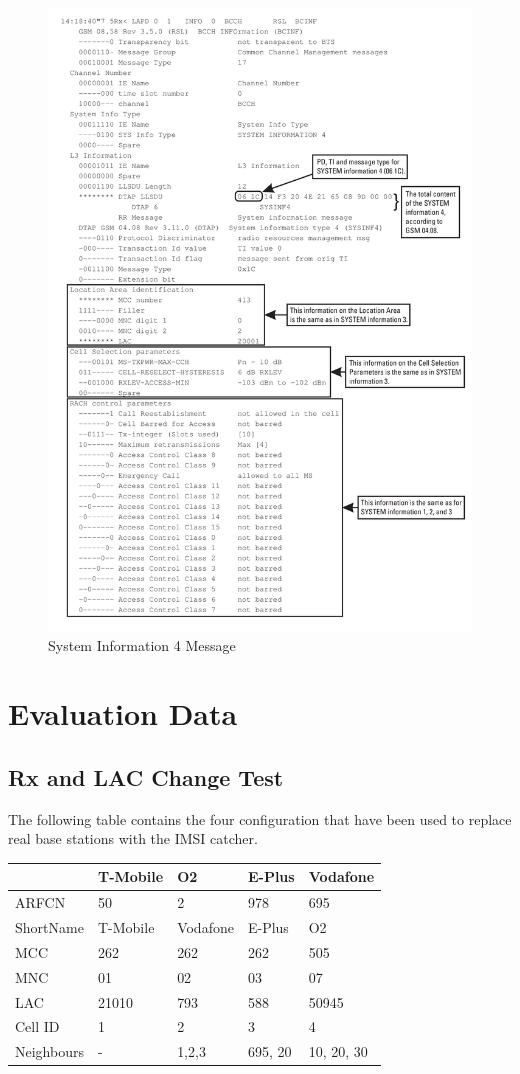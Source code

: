\begin{figure}
\centering
\includegraphics[width=.9\textwidth]{../Images/sysinfo4}
\caption{System Information 4 Message}
\end{figure}
\chapter{Evaluation Data}
\section{Rx and LAC Change Test}
\label{sec_lac_change_test}
The following table contains the four configuration that have been used to replace real base stations with the IMSI catcher.
\begin{center}
\begin{tabular}{lllll}
\toprule
			&T-Mobile		&O2				&E-Plus			&Vodafone\\
\midrule
ARFCN		&50				&2				&978			&695	\\
ShortName	&T-Mobile		&Vodafone		&E-Plus			&O2		\\
MCC			&262			&262			&262			&505	\\
MNC			&01				&02				&03				&07		\\
LAC			&21010			&793			&588			&50945	\\
Cell ID		&1				&2				&3				&4		\\
Neighbours	&-				&1,2,3			&695, 20		&10, 20, 30\\
\bottomrule
\end{tabular}
\end{center}
